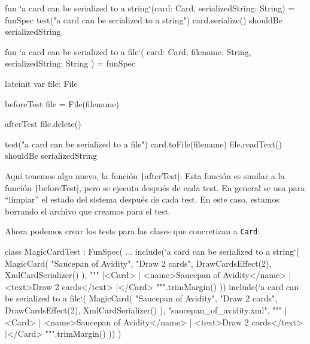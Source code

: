   \begin{kotlin}
    fun `a card can be serialized to a string`(card: Card, serializedString: String) =
      funSpec {
        test("a card can be serialized to a string") {
          card.serialize() shouldBe serializedString
        }
      }
  \end{kotlin}

  \begin{kotlin}
    fun `a card can be serialized to a file`(
      card: Card, filename: String, serializedString: String
    ) = funSpec {
      lateinit var file: File

      beforeTest {
        file = File(filename)
      }

      afterTest {
        file.delete()
      }

      test("a card can be serialized to a file") {
        card.toFile(filename)
        file.readText() shouldBe serializedString
      }
    }
  \end{kotlin}

  Aquí tenemos algo nuevo, la función \texttt|afterTest|.
  Esta función es similar a la función \texttt|beforeTest|, pero se ejecuta después de
  cada test.
  En general se usa para \enquote{limpiar} el estado del sistema después de cada test.
  En este caso, estamos borrando el archivo que creamos para el test.

  Ahora podemos crear los tests para las clases que concretizan a \texttt{Card}:

  \begin{kotlin}
    class MagicCardTest : FunSpec({
      ...
      include(`a card can be serialized to a string`(
        MagicCard(
          "Saucepan of Avidity",
          "Draw 2 cards",
          DrawCardsEffect(2),
          XmlCardSerializer()
        ),
        """
          |<Card>
          | <name>Saucepan of Avidity</name>
          | <text>Draw 2 cards</text>
          |</Card>
          """.trimMargin()
      ))
      include(`a card can be serialized to a file`(
        MagicCard(
          "Saucepan of Avidity",
          "Draw 2 cards",
          DrawCardsEffect(2),
          XmlCardSerializer()
        ),
        "saucepan_of_avidity.xml",
        """
          |<Card>
          | <name>Saucepan of Avidity</name>
          | <text>Draw 2 cards</text>
          |</Card>
          """.trimMargin()
      ))
    })
  \end{kotlin}